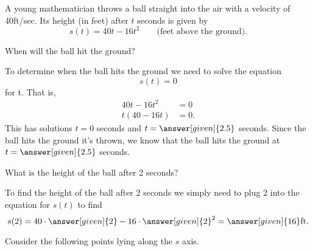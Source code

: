 \documentclass{ximera}
\begin{document}
\begin{example}
A young mathematician throws a ball straight into the air with 
a velocity of 40ft/sec. Its height (in feet) after $t$ seconds 
is given by
\[
s(t) = 40t-16t^2 \qquad\text{(feet above the ground)} .
\]

When will the ball hit the ground?

\begin{explanation}
To determine when the ball hits the ground we need to solve the
equation
\[
s(t)=0
\]
for t.  That is,
\begin{align*}
40t-16t^2 &= 0\\
t(40-16t) &= 0.
\end{align*}
This has solutions $t=0$
seconds and $t=\answer[given]{2.5}$ seconds.  Since the ball hits
the ground  it's
thrown, we know that the ball hits the ground at $t=\answer[given]{2.5}$
seconds.
\end{explanation}

What is the height of the ball after 2 seconds?

\begin{explanation}
To find the height of the ball after 2 seconds we simply need 
to plug 2 into the equation for $s(t)$ to find
\[
s(2) = 40\cdot\answer[given]{2} - 16\cdot\answer[given]{2}^2 = 
\answer[given]{16}\text{ft.}
\]

\end{explanation}

Consider the following points lying along the $s$ axis.



\end{example}
\end{document}
